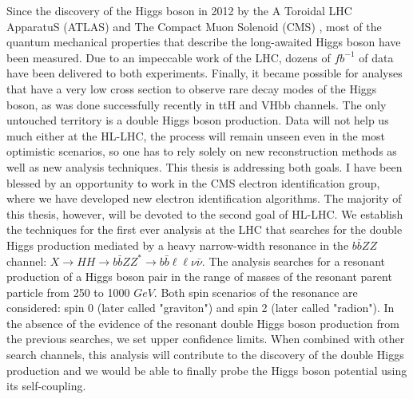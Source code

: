 Since the discovery of the Higgs boson in 2012 by the A Toroidal LHC ApparatuS (ATLAS) and 	The Compact Muon Solenoid (CMS)%
, most of the quantum mechanical properties that describe the long-awaited Higgs boson have been measured. Due to an impeccable work of the LHC, dozens of $fb^{-1}$ of data have been delivered to both experiments. Finally, it became possible for analyses that have a very low cross section to observe rare decay modes of the Higgs boson, as was done successfully recently in ttH and VHbb channels. The only untouched territory is a double Higgs boson production. Data will not help us much either at the HL-LHC, the process will remain unseen even in the most optimistic scenarios, so one has to rely solely on new reconstruction methods as well as new analysis techniques. This thesis is addressing both goals. I have been blessed by an opportunity to work in the CMS electron identification group, where we have developed new electron identification algorithms. The majority of this thesis, however, will be devoted to the second goal of HL-LHC. We establish the techniques for the first ever analysis at the LHC that searches for the double Higgs production mediated by a heavy narrow-width resonance in the $b\bar{b}ZZ$ channel:  $X \to HH \to b\bar{b}ZZ^{*} \to b\bar{b} \ell\ell\nu \bar{\nu}$. The analysis searches for a resonant production of a Higgs boson pair in the range of masses of the resonant parent particle from 250 to 1000 $GeV$. Both spin scenarios of the resonance are considered: spin 0 (later called "graviton") and spin 2 (later called "radion"). In the absence of the evidence of the resonant double Higgs boson production from the previous searches, we set upper confidence limits. When combined with other search channels, this analysis will contribute to the discovery of the double Higgs production and we would be able to finally probe the Higgs boson potential using its self-coupling. 